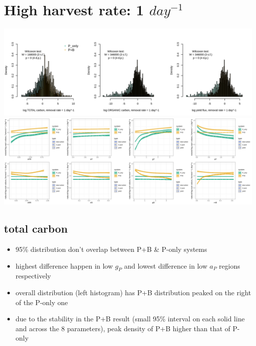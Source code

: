 \documentclass[a4paper]{article}
\begin{document}
\section{High harvest rate: 1 $day^{-1}$}
\includegraphics[width=\linewidth]{../result/sys_10.png}\\
\includegraphics[width=\linewidth]{../result/var_10.png}\\

\subsection{total carbon}
\begin{itemize}
    \item 95\% distribution don't overlap between P+B \& P-only systems
    \item highest difference happen in low $g_P$ and lowest difference in low $a_P$ regions respectively
    \item overall distribution (left histogram) has P+B distribution peaked on the right of the P-only one
    \item due to the stability in the P+B result (small 95\% interval on each solid line and across the 8 parameters), peak density of P+B higher than that of P-only
\end{itemize}
\end{document}
